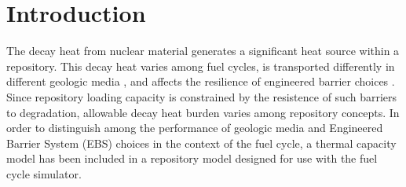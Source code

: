 \section{Introduction}
The decay heat from nuclear material generates a signiﬁcant heat source within a 
repository.  This decay heat varies among fuel cycles, is transported diﬀerently 
in diﬀerent geologic media \cite{greenberg_applications_2011}, and aﬀects the resilience of engineered 
barrier choices \cite{andra_argile:_2005}. Since repository loading capacity is constrained by 
the resistence of such barriers to degradation, allowable decay heat burden 
varies among repository concepts. In order to distinguish among the performance 
of geologic media and Engineered Barrier System (EBS) choices in the context of 
the fuel cycle, a thermal capacity model has been included in a repository 
model designed for use with the \Cyclus fuel cycle simulator.
